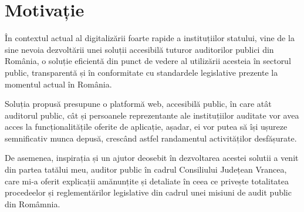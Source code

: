 \chapter*{Motivație} 

În contextul actual al digitalizării foarte rapide a instituțiilor statului, vine de la sine nevoia 
dezvoltării unei soluții accesibilă tuturor auditorilor publici din România, o soluție eficientă din punct de vedere al utilizării acesteia în sectorul public, transparentă și în conformitate cu standardele legislative prezente la momentul actual în România.
\par Soluția propusă presupune o platformă web, accesibilă public, în care atât auditorul public, cât și persoanele reprezentante ale instituțiilor auditate vor avea acces la funcționalitățile oferite de aplicație, așadar, ei vor putea să își ușureze semnificativ munca depusă, crescând astfel randamentul activităților desfășurate.
\par De asemenea, inspirația și un ajutor deosebit în dezvoltarea acestei solutii a venit din partea tatălui meu, auditor public în cadrul Consiliului Județean Vrancea, care mi-a oferit explicații amănunțite și detaliate în ceea ce privește totalitatea procedeelor și reglementărilor legislative din cadrul unei misiuni de audit public din Româmnia.